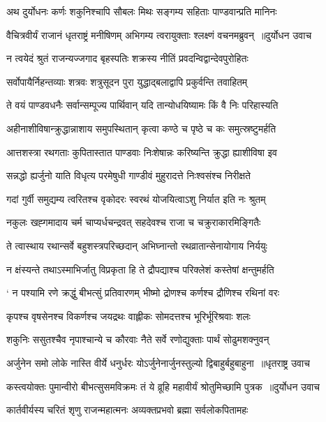 \twolineshloka
{अथ दुर्योधनः कर्णः शकुनिश्चापि सौबलः}
{मिथः सङ्गम्य सहिताः पाण्डवान्प्रति मानिनः}


\twolineshloka
{वैचित्रवीर्यं राजानं धृतराष्ट्रं मनीषिणम्}
{अभिगम्य त्वरायुक्ताः श्लक्ष्णं वचनमब्रुवन् ॥दुर्योधन उवाच}


\twolineshloka
{न त्वयेदं श्रुतं राजन्यज्जगाद बृहस्पतिः}
{शक्रस्य नीतिं प्रवदन्विद्वान्देवपुरोहितः}


\twolineshloka
{सर्वोपायैर्निहन्तव्याः शत्रवः शत्रुसूदन}
{पुरा युद्धाद्बलाद्वापि प्रकुर्वन्ति तवाहितम्}


\twolineshloka
{ते वयं पाण्डवधनैः सर्वान्सम्पूज्य पार्थिवान्}
{यदि तान्योधयिष्यामः किं वै निः परिहास्यति}


\twolineshloka
{अहीनाशीविषान्क्रुद्धान्नाशाय समुपस्थितान्}
{कृत्वा कण्ठे च पृष्ठे च कः समुत्स्रष्टुमर्हति}


\twolineshloka
{आत्तशस्त्रा रथगताः कुपितास्तात पाण्डवाः}
{निःशेषान्नः करिष्यन्ति क्रुद्धा ह्याशीविषा इव}


\twolineshloka
{सन्नद्धो ह्यर्जुनो याति विधृत्य परमेषुधी}
{गाण्डीवं मुहुरादत्ते निःश्वसंश्च निरीक्षते}


\twolineshloka
{गदां गुर्वी समुद्यम्य त्वरितश्च वृकोदरः}
{स्वरथं योजयित्वाऽशु निर्यात इति नः श्रुतम्}


\twolineshloka
{नकुलः खह्गमादाय चर्म चाप्यर्धचन्द्रवत्}
{सहदेवश्च राजा च चक्रुराकारमिङ्गितैः}


\twolineshloka
{ते त्वास्थाय रथान्सर्वे बहुशस्त्रपरिच्छदान्}
{अभिघ्नान्तो रथव्रातान्सेनायोगाय निर्ययुः}


\twolineshloka
{न क्षंस्यन्ते तथाऽस्माभिर्जातु विप्रकृता हि ते}
{द्रौपद्याश्च परिक्लेशं कस्तेषां क्षन्तुमर्हति}


\twolineshloka
{` न पश्यामि रणे क्रद्धुं बीभत्सुं प्रतिवारणम्}
{भीष्मो द्रोणश्च कर्णश्च द्रौणिश्च रथिनां वरः}


\twolineshloka
{कृपश्च वृषसेनश्च विकर्णश्च जयद्रथः}
{वाह्लीकः सोमदत्तश्च भूरिर्भूरिश्रवाः शलः}


\twolineshloka
{शकुनिः ससुतश्चैव नृपाश्चान्ये च कौरवाः}
{नैते सर्वे रणोद्युक्ताः पार्थं सोढुमशक्नुवन्}


\twolineshloka
{अर्जुनेन समो लोके नास्ति वीर्ये धनुर्धरः}
{योऽर्जुनेनार्जुनस्तुल्यो द्विबाहुर्बहुबाहुना ॥धृतराष्ट्र उवाच}


\twolineshloka
{कस्त्वयोक्तः पुमान्वीरो बीभत्सुसमविक्रमः}
{तं ये व्रूहि महावीर्यं श्रोतुमिच्छामि पुत्रक ॥दुर्योधन उवाच}


\twolineshloka
{कार्तवीर्यस्य चरितं शृणु राजन्महात्मनः}
{अव्यक्तप्रभवो ब्रह्मा सर्वलोकपितामहः}


